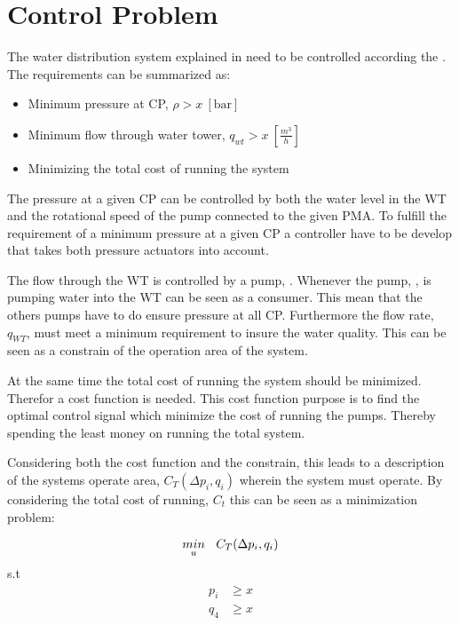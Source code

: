 \section{Control Problem}
\label{control_problem}

The water distribution system explained in  need to be controlled according the . The requirements can be summarized as: 

\begin{itemize}
	\item Minimum pressure at CP, $\rho > x \:[\text{bar}]$
	\item Minimum flow through water tower, $q_{wt} > x \:[\frac{m^3}{h}]$
	\item Minimizing the total cost of running the system
\end{itemize}

The pressure at a given CP can be controlled by both the water level in the WT and the rotational speed of the pump connected to the given PMA. To fulfill the requirement of a minimum pressure at a given CP a controller have to be develop that takes both pressure actuators into account. 

The flow through the WT is controlled by a pump, . Whenever the pump, , is pumping water into the WT can be seen as a consumer. This mean that the others pumps have to do ensure pressure at all CP. Furthermore the flow rate, $q_{WT}$, must meet a minimum requirement to insure the water quality. This can be seen as a constrain of the operation area of the system. 

At the same time the total cost of running the system should be minimized. Therefor a cost function is needed. This cost function purpose is to find the optimal control signal which minimize the cost of running the pumps. Thereby spending the least money on running the total system. 

Considering both the cost function and the constrain, this leads to a description of the systems operate area, $C_T(\Delta{p}_i,q_i)$ wherein the system must operate. By considering the total cost of running, $C_t$ this can be seen as a minimization problem:

\begin{equation}
\underset{u}{min} \: \: \: \: C_T(\Delta{p}_i,q_i) \\
\end{equation}
\vspace*{-0.4mm}
s.t 
\vspace*{-0.4mm}
\begin{align*}
p_i &\geq x \\
q_4 &\geq x 
\end{align*}

